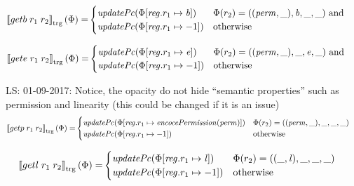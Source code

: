 \documentclass[a4paper]{article}
\newcommand\lau[1]{{\color{purple} \sf \footnotesize {LS: #1}}\\}
\newcommand{\sem}[1]{\left\llbracket #1 \right\rrbracket}
\newcommand{\tsem}[2][\Phi]{\sem{#2}_{\mathrm{trg}}(#1)}
\newcommand{\tand}{\text{ and }}
\newcommand{\totherwise}{\text{otherwise }}
\newcommand{\targetcolor}[1]{\color{black}}
\newcommand{\trg}[1]{{\targetcolor{} #1}}
\newcommand{\zinstr}[1]{#1}
\newcommand{\twoinstr}[3]{
  \ifthenelse{\equal{#2#3}{}}
  {\zinstr{#1}}
  {\zinstr{#1} \; #2 \; #3}
}
\newcommand{\tgetb}[2]{\twoinstr{\trg{getb}}{#1}{#2}}
\newcommand{\tgete}[2]{\twoinstr{\trg{gete}}{#1}{#2}}
\newcommand{\tgetp}[2]{\twoinstr{\trg{getp}}{#1}{#2}}
\newcommand{\tgetlin}[2]{\twoinstr{\trg{getl}}{#1}{#2}}
\newcommand{\update}[2]{[#1 \mapsto #2]}
\newcommand{\updReg}[2]{\update{\reg.#1}{#2}}
\newcommand{\perm}{\var{perm}}
\newcommand{\lin}{\var{l}}
\newcommand{\var}[1]{\mathit{#1}}
\newcommand{\reg}{\var{reg}}
\newcommand{\baddr}{\var{b}}
\newcommand{\eaddr}{\var{e}}
\newcommand{\plainfun}[2]{
  \ifthenelse{\equal{#2}{}}
  {\mathit{#1}}
  {\mathit{#1}(#2)}
}
\newcommand{\encPerm}[1]{\plainfun{encocePermission}{#1}}
\newcommand{\updPcAddr}[1]{\plainfun{updatePc}{#1}}
\begin{document}
\begin{align*}
  \tsem{\tgetb{r_1}{r_2}} = &
                              \begin{cases}
                                \updPcAddr{\Phi\update{\reg.r_1}{\baddr}} & 
                                \arraycolsep=0pt
                                \begin{array}[t]{l}
                                  \Phi(r_2) = ((\perm,\_),\baddr,\_,\_) \tand \\
                                \end{array} \\
                                \updPcAddr{\Phi\updReg{r_1}{-1}} & \totherwise
                              \end{cases}
\end{align*}

\begin{align*}
  \tsem{\tgete{r_1}{r_2}} = &
                              \begin{cases}
                                \updPcAddr{\Phi\update{\reg.r_1}{\eaddr}} & 
                                \arraycolsep=0pt
                                \begin{array}[t]{l}
                                  \Phi(r_2) = ((\perm,\_),\_,\eaddr,\_) \tand \\
                                \end{array} \\
                                \updPcAddr{\Phi\updReg{r_1}{-1}} & \totherwise
                              \end{cases}
\end{align*}

\lau{01-09-2017: Notice, the opacity do not hide ``semantic properties'' such as permission and linearity (this could be changed if it is an issue)}

\begin{align*}
  \tsem{\tgetp{r_1}{r_2}} = & 
                              \begin{cases}
                                \updPcAddr{}(\Phi\update{\reg.r_1}{\encPerm{\perm}}) & \Phi(r_2) = ((\perm,\_),\_,\_,\_)\\
                                \updPcAddr{\Phi\updReg{r_1}{-1}} & \totherwise
                              \end{cases}
\end{align*}

\begin{align*}
  \tsem{\tgetlin{r_1}{r_2}} = &                              
                              \begin{cases}
                                \updPcAddr{}(\Phi\update{\reg.r_1}{\lin}) & \Phi(r_2) = ((\_,\lin),\_,\_,\_) \\
                                \updPcAddr{\Phi\updReg{r_1}{-1}} & \totherwise
                              \end{cases}
\end{align*}
\end{document}
